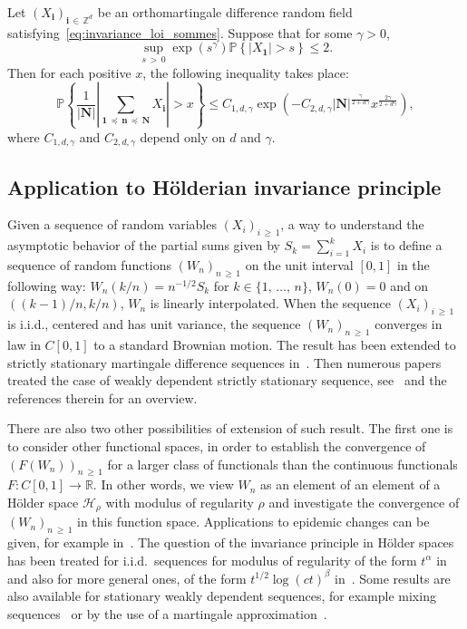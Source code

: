 \documentclass[AHL,Unicode,longabstracts,published]{cedram}
\newcommand{\clH}{\mathcal{H}}
\newcommand\R{\mathbb{R}}
\newcommand\PP{\mathbb{P}}
\newcommand\Z{\mathbb{Z}}
\newcommand\ens[1]{\{ #1\}}
\newcommand{\pr}[1]{(#1)}
\newcommand{\gr}[1]{\bm{#1}}
\newcommand{\gri}{\bm{i}}
\newcommand{\imd}{\preccurlyeq}
\begin{document}
\begin{theo}\label{thm:large_deviation}
Let $\pr{X_{\gri}}_{\gri\,\in\,\Z^d}$ be an orthomartingale difference random field satisfying~\eqref{eq:invariance_loi_sommes}. Suppose that for some $\gamma>0$,
\begin{equation}
\sup_{s\,>\,0}\exp\left(s^\gamma\right)\PP\left\{\left|X_{\gr{1}}\right|>s\right\}\leq 2.
\end{equation}
Then for each positive $x$, the following inequality takes place:
\begin{equation}
\PP\left\{\frac 1{\left|\gr{N}\right|}\left| \sum_{\gr{1}\,\imd\,
\gr{n}\,\imd\,\gr{N}} X_{\gri}\right| >x\right\}\leq C_{1,d,\gamma}\exp\left(-C_{2,d,\gamma}
\left|\gr{N}\right|^{\frac{\gamma}{2+d\gamma}}x^{\frac{2\gamma}{2+d\gamma}} \right),
\end{equation}
where $C_{1,d,\gamma}$ and $C_{2,d,\gamma}$ depend only on $d$ and $\gamma$.
\end{theo}



\subsection{Application to H\"olderian invariance principle}\label{subsc:HWIP}
Given a sequence of random variables $\pr{X_i}_{i\,\geq\,1}$, a way to understand the asymptotic behavior of the partial sums given by $S_k=\sum_{i=1}^kX_i$ is to define a sequence of random functions $\pr{W_n}_{n\,\geq\,1}$ on the unit interval $[0,1]$ in the following way: $W_n\pr{k/n} =n^{-1/2}S_k$ for $k\in\ens{1,\,\dots,\,n}$, $W_n\pr{0}=0$ and on $\pr{\pr{k-1}/n,k/n}$, $W_n$ is linearly interpolated. When the sequence $\pr{X_i}_{i\,\geq\,1}$ is i.i.d., centered and has unit variance, the sequence $\pr{W_n}_{n\,\geq\,1}$ converges in law in $C[0,1]$ to a standard Brownian motion. The result has been extended to strictly stationary martingale difference sequences in~\cite{MR0126871,MR0151997}. Then numerous papers treated the case of weakly dependent strictly stationary sequence, see~\cite{MR2206313} and the references therein for an overview.

There are also two other possibilities of extension of such result. The first one is to consider other functional spaces, in order to establish the convergence of $\pr{F\pr{W_n}}_{n\,\geq\,1}$ for a larger class of functionals than the continuous functionals $F\colon C[0,1]\to\R$. In other words, we view $W_n$ as an element of an element of a H\"older space $\clH_\rho$ with modulus of regularity $\rho$ and investigate the convergence of $\pr{W_n}_{n\,\geq\,1}$ in this function space. Applications to epidemic changes can be given, for example in~\cite{MR2265057}. The question of the invariance principle in H\"older spaces has been treated for i.i.d.\ sequences for modulus of regularity of the form $t^\alpha$ in~\cite{MR2000642} and also for more general ones, of the form $t^{1/2}\log
\pr{ct}^\beta$ in~\cite{MR2054586}. Some results are also available for stationary weakly dependent sequences, for example mixing sequences~\cite{MR3615086,MR1759810} or by the use of a martingale approximation~\cite{MR3426520,MR3770868}.
\end{document}
